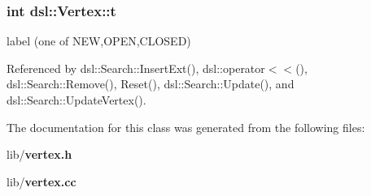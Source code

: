 \subsubsection[{t}]{\setlength{\rightskip}{0pt plus 5cm}int dsl\-::\-Vertex\-::t\hspace{0.3cm}{\ttfamily [protected]}}\label{classdsl_1_1Vertex_a37774ca86c886bfd93a2b5e1f22328b5}


label (one of N\-E\-W,O\-P\-E\-N,C\-L\-O\-S\-E\-D) 



Referenced by dsl\-::\-Search\-::\-Insert\-Ext(), dsl\-::operator$<$$<$(), dsl\-::\-Search\-::\-Remove(), Reset(), dsl\-::\-Search\-::\-Update(), and dsl\-::\-Search\-::\-Update\-Vertex().



The documentation for this class was generated from the following files\-:\begin{DoxyCompactItemize}
\item 
lib/{\bf vertex.\-h}\item 
lib/{\bf vertex.\-cc}\end{DoxyCompactItemize}

